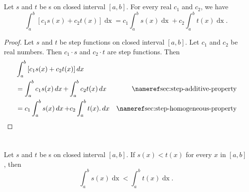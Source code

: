 \documentclass{report}
\begin{document}
\section{}%
\label{sec:step-linearity-property}

Let $s$ and $t$ be s on closed interval $[a, b]$.
For every real $c_1$ and $c_2$, we have
  $$\int_a^b \left[ c_1s(x) + c_2t(x) \right] \mathop{dx} =
    c_1\int_a^b s(x) \mathop{dx} + c_2\int_a^b t(x) \mathop{dx}.$$

\begin{proof}

  Let $s$ and $t$ be step functions on closed interval $[a, b]$.
  Let $c_1$ and $c_2$ be real numbers.
  Then $c_1 \cdot s$ and $c_2 \cdot t$ are step functions.
  Then
    \begin{align*}
      & \int_a^b \left[ c_1s(x) + c_2t(x) \right] \mathop{dx} \\
      & = \int_a^b c_1s(x) \mathop{dx} + \int_a^b c_2t(x) \mathop{dx}
        & \textref{sec:step-additive-property} \\
      & = c_1\int_a^b s(x) \mathop{dx} + c_2\int_a^b t(x). \mathop{dx}
        & \textref{sec:step-homogeneous-property}
    \end{align*}

\end{proof}

\section{}%
\label{sec:step-comparison-theorem}

Let $s$ and $t$ be s on closed interval $[a, b]$.
If $s(x) < t(x)$ for every $x$ in $[a, b]$, then
  $$\int_a^b s(x) \mathop{dx} < \int_a^b t(x) \mathop{dx}.$$
\end{document}
